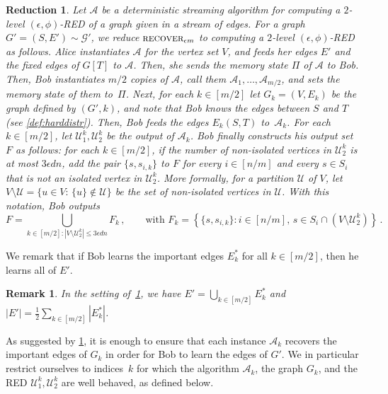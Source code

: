 \documentclass[epsfig,letter,11pt]{article}
\numberwithin{equation}{section}
\DeclareMathOperator*{\recover}{\textsc{recover}}
\newtheorem{remark}{Remark}
\newtheorem{reduct}[theorem]{Reduction}
\begin{document}
\begin{reduct}
	\label{red:recover}
	Let $\mathcal{A}$ be a deterministic streaming algorithm for computing a $2$-level $(\epsilon,\phi)$-RED of a graph given in a stream of edges. For a graph $G'=(S,E') \sim \mathcal{G}'$, we reduce $\recover_{\epsilon m}$ to computing a $2$-level $(\epsilon,\phi)$-RED as follows. Alice instantiates $\mathcal{A}$ for the vertex set $V$, and feeds her edges $E'$ and the fixed edges of $G[T]$ to $\mathcal{A}$. Then, she sends the memory state $\Pi$ of $\mathcal{A}$ to Bob. Then, Bob instantiates $m/2$ copies of $\mathcal{A}$, call them $\mathcal{A}_1, \dots, \mathcal{A}_{m/2}$, and sets the memory state of them to~$\Pi$. Next, for each $k \in [m/2]$ let $G_k = (V,E_k)$ be the graph defined by $(G',k)$, and note that Bob knows the edges between $S$ and $T$ (see \cref{def:harddistr}). Then, Bob feeds the edges $E_k(S,T)$ to~$\mathcal{A}_k$. For each $k \in [m/2]$, let $\mathcal{U}^k_1,\mathcal{U}^k_2$ be the output of $\mathcal{A}_k$. Bob finally constructs his output set $F$ as follows: for each $k \in [m/2]$, if the number of non-isolated vertices in $\mathcal{U}^k_2$ is at most $3 \epsilon d n$, add the pair $\{s,s_{i,k}\}$ to $F$ for every $i \in [n/m]$ and every $s \in S_i$ that is not an isolated vertex in $\mathcal{U}^k_2$. More formally, for a partition $\mathcal{U}$ of $V$, let $V \setminus \mathcal{U} = \{u \in V: \, \{u\} \notin \mathcal{U}\}$ be the set of non-isolated vertices in $\mathcal{U}$. With this notation, Bob outputs
	\begin{equation}
		\label{eq:boboutput}
		F = \bigcup_{k\in [m/2] : |V \setminus \mathcal{U}_2^k| \le 3\epsilon dn} F_k \, , \quad \quad \text{with } F_k=\left\{ \{s,s_{i,k}\} : i \in [n/m],\, s \in S_i \cap (V \setminus \mathcal{U}_2^k) \right\} \, .
	\end{equation} 
\end{reduct}
\noindent
We remark that if Bob learns the important edges $E^*_k$ for all $k \in [m/2]$, then he learns all of $E'$.
\begin{remark}
	\label{rmk:unionimportant}
	In the setting of~\cref{red:recover}, we have $E' = \bigcup_{k \in [m/2]} E^*_k$ and $|E'| = \frac{1}{2} \sum_{k \in [m/2]} |E^*_k|$.
\end{remark}
\noindent
As suggested by \cref{rmk:unionimportant}, it is enough to ensure that each instance $\mathcal{A}_k$ recovers the important edges of $G_k$ in order for Bob to learn the edges of $G'$. We in particular restrict ourselves to indices~$k$ for which the algorithm $\mathcal{A}_k$, the graph $G_k$, and the RED $\mathcal{U}_1^k,\mathcal{U}_2^k$ are well behaved, as defined below.
\end{document}
